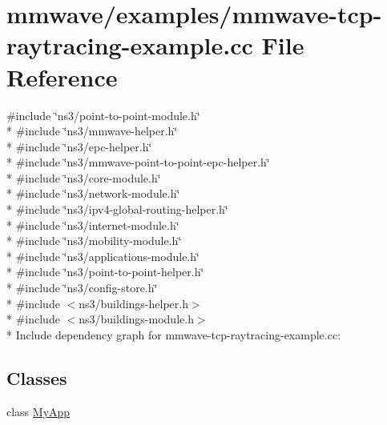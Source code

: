 \hypertarget{mmwave-tcp-raytracing-example_8cc}{}\section{mmwave/examples/mmwave-\/tcp-\/raytracing-\/example.cc File Reference}
\label{mmwave-tcp-raytracing-example_8cc}
{\ttfamily \#include \char`\"{}ns3/point-\/to-\/point-\/module.\+h\char`\"{}}\\*
{\ttfamily \#include \char`\"{}ns3/mmwave-\/helper.\+h\char`\"{}}\\*
{\ttfamily \#include \char`\"{}ns3/epc-\/helper.\+h\char`\"{}}\\*
{\ttfamily \#include \char`\"{}ns3/mmwave-\/point-\/to-\/point-\/epc-\/helper.\+h\char`\"{}}\\*
{\ttfamily \#include \char`\"{}ns3/core-\/module.\+h\char`\"{}}\\*
{\ttfamily \#include \char`\"{}ns3/network-\/module.\+h\char`\"{}}\\*
{\ttfamily \#include \char`\"{}ns3/ipv4-\/global-\/routing-\/helper.\+h\char`\"{}}\\*
{\ttfamily \#include \char`\"{}ns3/internet-\/module.\+h\char`\"{}}\\*
{\ttfamily \#include \char`\"{}ns3/mobility-\/module.\+h\char`\"{}}\\*
{\ttfamily \#include \char`\"{}ns3/applications-\/module.\+h\char`\"{}}\\*
{\ttfamily \#include \char`\"{}ns3/point-\/to-\/point-\/helper.\+h\char`\"{}}\\*
{\ttfamily \#include \char`\"{}ns3/config-\/store.\+h\char`\"{}}\\*
{\ttfamily \#include $<$ns3/buildings-\/helper.\+h$>$}\\*
{\ttfamily \#include $<$ns3/buildings-\/module.\+h$>$}\\*
Include dependency graph for mmwave-\/tcp-\/raytracing-\/example.cc\+:
\subsection*{Classes}
\begin{DoxyCompactItemize}
\item 
class \hyperlink{classMyApp}{My\+App}
\end{DoxyCompactItemize}
